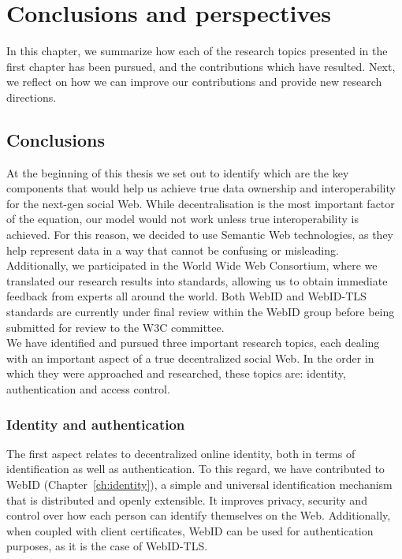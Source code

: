 \chapter{Conclusions and perspectives}
\label{ch:conclusions}
In this chapter, we summarize how each of the research topics presented in the first chapter has been pursued, and the contributions which have resulted. Next, we reflect on how we can improve our contributions and provide new research directions.

\section{Conclusions}
At the beginning of this thesis we set out to identify which are the key components that would help us achieve true data ownership and interoperability for the next-gen social Web. While decentralisation is the most important factor of the equation, our model would not work unless true interoperability is achieved. For this reason, we decided to use Semantic Web technologies, as they help represent data in a way that cannot be confusing or misleading. Additionally, we participated in the World Wide Web Consortium, where we translated our research results into standards, allowing us to obtain immediate feedback from experts all around the world. Both WebID and WebID-TLS standards are currently under final review within the WebID group before being submitted for review to the W3C committee.\\

We have identified and pursued three important research topics, each dealing with an important aspect of a true decentralized social Web. In the order in which they were approached and researched, these topics are: identity, authentication and access control.

\subsection{Identity and authentication}
The first aspect relates to decentralized online identity, both in terms of identification as well as authentication. To this regard, we have contributed to WebID (Chapter~\ref{ch:identity}), a simple and universal identification mechanism that is distributed and openly extensible. It improves privacy, security and control over how each person can identify themselves on the Web. Additionally, when coupled with client certificates, WebID can be used for authentication purposes, as it is the case of WebID-TLS.\\

